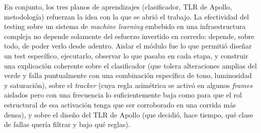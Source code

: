 En conjunto, los tres planos de aprendizajes (clasificador, TLR de Apollo, metodología) refuerzan la idea con la que se abrió el trabajo. La efectividad del testing sobre un sistema de \textit{machine learning} embebido en una infraestructura compleja no depende solamente del esfuerzo invertido en correrlo: depende, sobre todo, de poder verlo desde adentro. Aislar el módulo fue lo que permitió diseñar un test específico, ejecutarlo, observar lo que pasaba en cada etapa, y construir una explicación coherente sobre el clasificador (que tolera alteraciones amplias del verde y falla puntualmente con una combinación específica de tono, luminosidad y saturación), sobre el \textit{tracker} (cuya regla asimétrica se activó en algunos \textit{frames} aislados pero con una frecuencia lo suficientemente baja como para que el rol estructural de esa activación tenga que ser corroborado en una corrida más densa), y sobre el diseño del TLR de Apollo (que decidió, hace tiempo, qué clase de fallas quería filtrar y bajo qué reglas).
